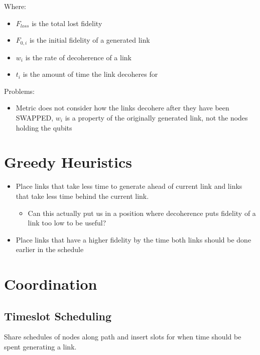 \documentclass{article}
\begin{document}
Where:
\begin{itemize}
    \item $F_{loss}$ is the total lost fidelity
    \item $F_{0,i}$ is the initial fidelity of a generated link
    \item $w_i$ is the rate of decoherence of a link
    \item $t_i$ is the amount of time the link decoheres for
\end{itemize}

Problems:
\begin{itemize}
    \item Metric does not consider how the links decohere after they have been SWAPPED, $w_i$ is a property of the
    originally generated link, not the nodes holding the qubits
\end{itemize}

\section{Greedy Heuristics}
\begin{itemize}
    \item Place links that take less time to generate ahead of current link and links that take less time behind the current link.
    \begin{itemize}
        \item Can this actually put us in a position where decoherence puts fidelity of a link too low to be useful?
    \end{itemize}
    \item Place links that have a higher fidelity by the time both links should be done earlier in the schedule
\end{itemize}

\section{Coordination}
\subsection{Timeslot Scheduling}
Share schedules of nodes along path and insert slots for when time should be spent generating a link.
\end{document}
